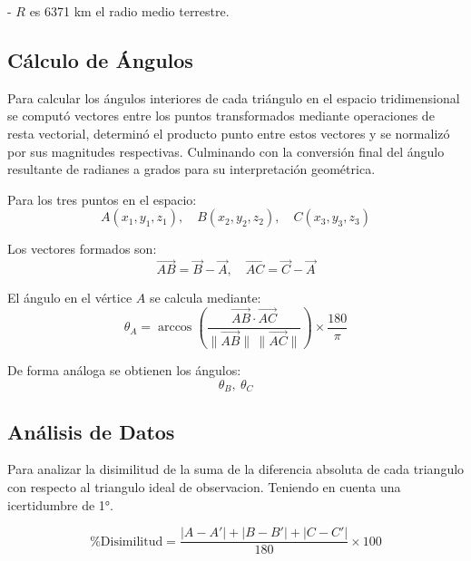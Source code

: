 \documentclass[a4paper,alpha-refs]{eSpectra}
\begin{document}
- \(R\) es 6371 km el radio medio terrestre.



\subsection{Cálculo de Ángulos}
Para calcular los ángulos interiores de cada triángulo en el espacio tridimensional se computó vectores entre los puntos transformados mediante operaciones de resta vectorial, determinó el producto punto entre estos vectores y se normalizó por sus magnitudes respectivas.  Culminando con la conversión final del ángulo resultante de radianes a grados para su interpretación geométrica.

\smallskip

Para los tres puntos en el espacio:
\[
A(x_1, y_1, z_1), \quad B(x_2, y_2, z_2), \quad C(x_3, y_3, z_3)
\]

Los vectores formados son:
\[
\vec{AB} = \vec{B} - \vec{A}, \quad
\vec{AC} = \vec{C} - \vec{A}
\]

El ángulo en el vértice \(A\) se calcula mediante:
\[
\theta_A = \arccos \left(
\frac{ \vec{AB} \cdot \vec{AC} }{ \lVert \vec{AB} \rVert \, \lVert \vec{AC} \rVert }
\right) \times \frac{180}{\pi}
\]

De forma análoga se obtienen los ángulos:
\[
\theta_B, \ \theta_C
\]

\vspace{-\baselineskip}  %
\vspace{-0.5\baselineskip}  %

\subsection{Análisis de Datos }

Para analizar la disimilitud de la suma de la diferencia absoluta de cada triangulo con respecto al triangulo ideal de observacion. Teniendo en cuenta una icertidumbre de 1°.


\begin{equation}
\% \text{Disimilitud} = 
\frac{ \left| A - A' \right| + \left| B - B' \right| + \left| C - C' \right| }{180} \times 100
\end{equation}
\end{document}
